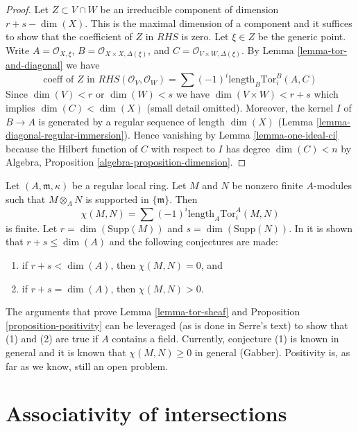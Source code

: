 \begin{proof}
\medskip\noindent
Let $Z \subset V \cap W$ be an irreducible component of dimension
$r + s - \dim(X)$. This is the maximal dimension of a component
and it suffices to show that the coefficient of $Z$ in $RHS$ is zero.
Let $\xi \in Z$ be the generic point. Write $A = \mathcal{O}_{X, \xi}$,
$B = \mathcal{O}_{X \times X, \Delta(\xi)}$, and
$C = \mathcal{O}_{V \times W, \Delta(\xi)}$.
By Lemma \ref{lemma-tor-and-diagonal} we have
$$
\text{coeff of }Z\text{ in }
RHS(\mathcal{O}_V, \mathcal{O}_W) = 
\sum (-1)^i
\text{length}_B \text{Tor}_i^B(A, C)
$$
Since $\dim(V) < r$ or $\dim(W) < s$ we have $\dim(V \times W) < r + s$
which implies $\dim(C) < \dim(X)$ (small detail omitted). Moreover, the
kernel $I$ of $B \to A$ is generated by a regular sequence of
length $\dim(X)$ (Lemma \ref{lemma-diagonal-regular-immersion}).
Hence vanishing by Lemma \ref{lemma-one-ideal-ci} because
the Hilbert function of $C$ with respect to $I$ has degree $\dim(C) < n$
by Algebra, Proposition \ref{algebra-proposition-dimension}.
\end{proof}

\begin{remark}
\label{remark-Serre-conjectures}
Let $(A, \mathfrak m, \kappa)$ be a regular local ring.
Let $M$ and $N$ be nonzero finite $A$-modules such that $M \otimes_A N$
is supported in $\{\mathfrak m\}$. Then
$$
\chi(M, N) = \sum (-1)^i \text{length}_A \text{Tor}_i^A(M, N)
$$
is finite. Let $r = \dim(\text{Supp}(M))$ and $s = \dim(\text{Supp}(N))$.
In \cite{Serre_algebre_locale} it is shown that $r + s \leq \dim(A)$
and the following conjectures are made:
\begin{enumerate}
\item if $r + s < \dim(A)$, then $\chi(M, N) = 0$, and
\item if $r + s = \dim(A)$, then $\chi(M, N) > 0$.
\end{enumerate}
The arguments that prove Lemma \ref{lemma-tor-sheaf} and
Proposition \ref{proposition-positivity} can be leveraged
(as is done in Serre's text) to show that (1) and (2) are
true if $A$ contains a field. Currently, conjecture (1) is known
in general and it is known that $\chi(M, N) \geq 0$ in general (Gabber).
Positivity is, as far as we know, still an open problem.
\end{remark}



\section{Associativity of intersections}
\label{section-associative}

